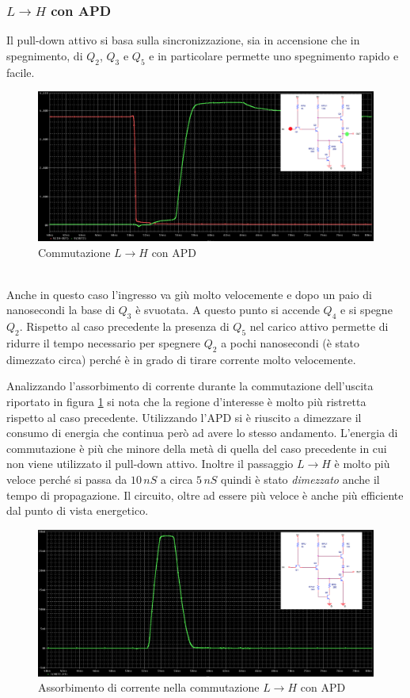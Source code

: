 \documentclass[12pt, a4paper]{report}
\begin{document}
\subsubsection{$L \rightarrow H$ con APD}
Il pull-down attivo si basa sulla sincronizzazione, sia in accensione che in spegnimento, di $Q_2$, $Q_3$ e $Q_5$ e in particolare permette uno spegnimento rapido e facile.
\begin{figure}[h]
    \centering
    \includegraphics[scale=0.35,angle=0]{ttl_l_to_h_apd1.png}
    \caption{Commutazione $L \rightarrow H$ con APD}
\end{figure}
\\Anche in questo caso l'ingresso va giù molto velocemente e dopo un paio di nanosecondi la base di $Q_3$ è svuotata. A questo punto si accende $Q_4$ e si spegne $Q_2$. Rispetto al caso precedente la presenza di $Q_5$ nel carico attivo permette di ridurre il tempo necessario per spegnere $Q_2$ a pochi nanosecondi (è stato dimezzato circa) perché è in grado di tirare corrente molto velocemente.

Analizzando l'assorbimento di corrente durante la commutazione dell'uscita riportato in figura \ref{l_to_h2} si nota che la regione d'interesse è molto più ristretta rispetto al caso precedente. Utilizzando l'APD si è riuscito a dimezzare il consumo di energia che continua però ad avere lo stesso andamento. L'energia di commutazione è più che minore della metà di quella del caso precedente in cui non viene utilizzato il pull-down attivo. Inoltre il passaggio $L \rightarrow H$ è molto più veloce perché si passa da $10\,nS$ a circa $5\,nS$ quindi è stato \textit{dimezzato} anche il tempo di propagazione. Il circuito, oltre ad essere più veloce è anche più efficiente dal punto di vista energetico.
\begin{figure}[ht]
    \centering
    \includegraphics[scale=0.35,angle=0]{ttl_l_to_h_apd2.png}
    \caption{Assorbimento di corrente nella commutazione $L \rightarrow H$ con APD}
    \label{l_to_h2}
\end{figure}
\end{document}
